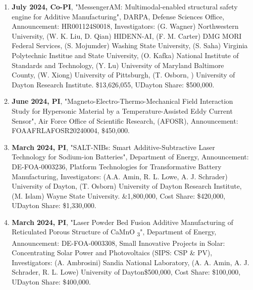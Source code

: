 \documentclass[11pt, letterpaper]{article}
\begin{document}
\begin{enumerate}[label=\arabic*., itemsep=-1pt, topsep=2pt]
        \item \textbf{July 2024, Co-PI}, "MessengerAM: Multimodal-enabled structural safety engine for Additive Manufacturing", DARPA, Defense Sciences Office, Announcement: HR001124S0018, Investigators: (G. Wagner) Northwestern University, (W. K. Liu, D. Qian) HIDENN-AI, (F. M. Carter) DMG MORI Federal Services, (S. Mojumder) Washing State University, (S. Saha) Virginia Polytechnic Institue and State University, (O. Kafka) National Institute of Standards and Technology, (Y. Lu) University of Maryland Baltimore County, (W. Xiong) University of Pittsburgh, (T. Osborn, ) University of Dayton Research Institute. \$13,626,055, UDayton Share: \$500,000.
        \item \textbf{June 2024, PI}, "Magneto-Electro-Thermo-Mechanical Field Interaction Study for Hypersonic Material by a Temperature-Assisted Eddy Current Sensor", Air Force Office of Scientific Research, (AFOSR), Announcement: FOAAFRLAFOSR20240004, \$450,000.
        \item \textbf{March 2024, PI}, "SALT-NIBs: Smart Additive-Subtractive Laser Technology for Sodium-ion Batteries", Department of Energy, Announcement: DE-FOA-0003236, Platform Technologies for Transformative Battery Manufacturing, Investigators: (A.A. Amin, R. L. Lowe, A. J. Schrader) University of Dayton, (T. Osborn) University of Dayton Research Institute, (M. Islam) Wayne State University. \&1,800,000, Cost Share: \$420,000, UDayton Share: \$1,330,000.
        \item \textbf{March 2024, PI}, "Laser Powder Bed Fusion Additive Manufacturing of Reticulated Porous Structure of CaMnO \textsubscript{3}", Department of Energy, Announcement: DE-FOA-0003308, Small Innovative Projects in Solar: Concentrating Solar Power and Photovoltaics (SIPS: CSP \& PV), Investigators: (A. Ambrosini) Sandia National Laboratory, (A. A. Amin, A. J. Schrader, R. L. Lowe) University of Dayton\$500,000, Cost Share: \$100,000, UDayton Share: \$400,000.
    \end{enumerate}
\end{document}
